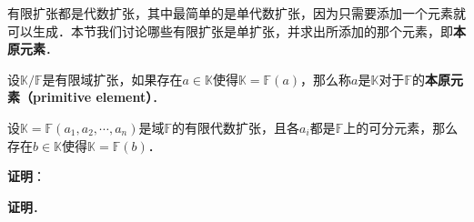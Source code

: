 


有限扩张都是代数扩张，其中最简单的是单代数扩张，因为只需要添加一个元素就可以生成．本节我们讨论哪些有限扩张是单扩张，并求出所添加的那个元素，即\textbf{本原元素}．

\begin{definition}{}

设$\mathbb{K}/\mathbb{F}$是有限域扩张，如果存在$a\in\mathbb{K}$使得$\mathbb{K}=\mathbb{F}(a)$，那么称$a$是$\mathbb{K}$对于$\mathbb{F}$的\textbf{本原元素（primitive element）}．

\end{definition}



\begin{theorem}{}
设$\mathbb{K}=\mathbb{F}(a_1, a_2, \cdots, a_n)$是域$\mathbb{F}$的有限代数扩张，且各$a_i$都是$\mathbb{F}$上的可分元素，那么存在$b\in\mathbb{K}$使得$\mathbb{K}=\mathbb{F}(b)$．
\end{theorem}

\textbf{证明}：



\textbf{证明}．





























